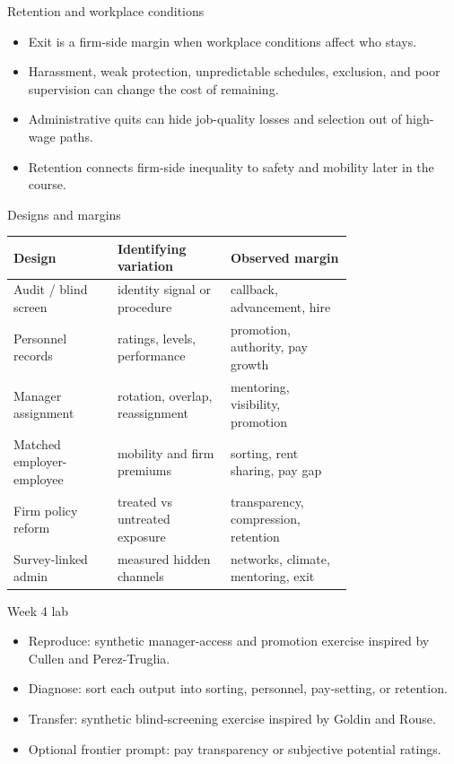 \documentclass[aspectratio=169,11pt]{beamer}
\begin{document}
\begin{frame}{Retention and workplace conditions}
\begin{itemize}
    \item Exit is a firm-side margin when workplace conditions affect who stays.
    \item Harassment, weak protection, unpredictable schedules, exclusion, and poor supervision can change the cost of remaining.
    \item Administrative quits can hide job-quality losses and selection out of high-wage paths.
    \item Retention connects firm-side inequality to safety and mobility later in the course.
\end{itemize}
\end{frame}

\begin{frame}{Designs and margins}
\scriptsize
\setlength{\tabcolsep}{3pt}
\begin{tabular}{p{0.23\linewidth} p{0.25\linewidth} p{0.27\linewidth}}
\toprule
Design & Identifying variation & Observed margin \\
\midrule
Audit / blind screen & identity signal or procedure & callback, advancement, hire \\
Personnel records & ratings, levels, performance & promotion, authority, pay growth \\
Manager assignment & rotation, overlap, reassignment & mentoring, visibility, promotion \\
Matched employer-employee & mobility and firm premiums & sorting, rent sharing, pay gap \\
Firm policy reform & treated vs untreated exposure & transparency, compression, retention \\
Survey-linked admin & measured hidden channels & networks, climate, mentoring, exit \\
\bottomrule
\end{tabular}
\end{frame}

\begin{frame}{Week 4 lab}
\begin{itemize}
    \item Reproduce: synthetic manager-access and promotion exercise inspired by Cullen and Perez-Truglia.
    \item Diagnose: sort each output into sorting, personnel, pay-setting, or retention.
    \item Transfer: synthetic blind-screening exercise inspired by Goldin and Rouse.
    \item Optional frontier prompt: pay transparency or subjective potential ratings.
\end{itemize}
\end{frame}
\end{document}
